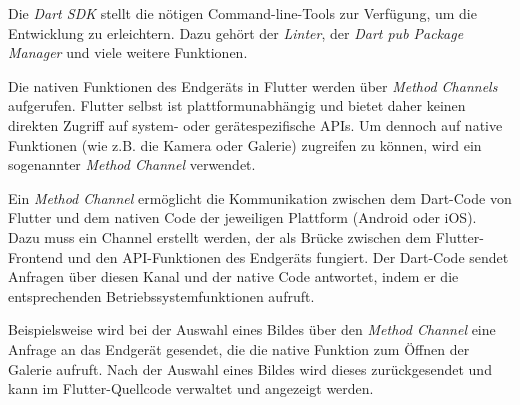 \vspace{0.5cm}

Die \textit{Dart SDK} stellt die nötigen Command-line-Tools zur Verfügung, um die Entwicklung zu erleichtern. Dazu gehört der \textit{Linter}, der \textit{Dart pub Package Manager} und viele weitere Funktionen.

\vspace{0.5cm}

Die nativen Funktionen des Endgeräts in Flutter werden über \textit{Method Channels} aufgerufen. Flutter selbst ist plattformunabhängig und bietet daher keinen direkten Zugriff auf system- oder gerätespezifische APIs. Um dennoch auf native Funktionen (wie z.B. die Kamera oder Galerie) zugreifen zu können, wird ein sogenannter \textit{Method Channel} verwendet.

\vspace{0.5cm}

Ein \textit{Method Channel} ermöglicht die Kommunikation zwischen dem Dart-Code von Flutter und dem nativen Code der jeweiligen Plattform (Android oder iOS). Dazu muss ein Channel erstellt werden, der als Brücke zwischen dem Flutter-Frontend und den API-Funktionen des Endgeräts fungiert. Der Dart-Code sendet Anfragen über diesen Kanal und der native Code antwortet, indem er die entsprechenden Betriebssystemfunktionen aufruft.

\vspace{0.5cm}

Beispielsweise wird bei der Auswahl eines Bildes über den \textit{Method Channel} eine Anfrage an das Endgerät gesendet, die die native Funktion zum Öffnen der Galerie aufruft. Nach der Auswahl eines Bildes wird dieses zurückgesendet und kann im Flutter-Quellcode verwaltet und angezeigt werden.